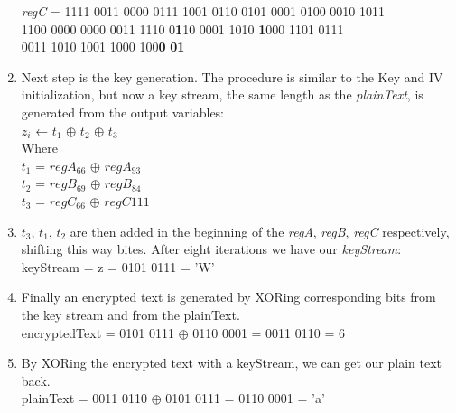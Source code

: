 \begin{enumerate}
{			\emph{regC} = 1111 0011 0000 0111 1001 0110 0101 0001 0100 0010 1011 \\ 
			\indent\hspace{1.6cm}1100 0000 0000 0011 1110 0\textbf{1}10 0001 1010 \textbf{1}000 1101 0111 \\
			\indent\hspace{1.6cm}0011 1010 1001 1000 100\textbf{0} \textbf{01}
		}
		\item Next step is the key generation. The procedure is similar to the Key and IV initialization, but now a key stream, the same length as the \emph{plainText}, is generated from the output variables:\\
		{\selectfont
			$z_i$ ← $t_1$ $\oplus$ $t_2$ $\oplus$ $t_3$\\
			Where \\
			$t_1$ = $regA_{66}$ $\oplus$ $regA_{93}$\\
			$t_2$ = $regB_{69}$ $\oplus$ $regB_{84}$\\
			$t_3$ = $regC_{66}$ $\oplus$ $regC{111}$
		}
		\item \emph{$t_3$}, \emph{$t_1$}, \emph{$t_2$} are then added in the beginning of the \emph{regA}, \emph{regB}, \emph{regC} respectively, shifting this way bites. After eight iterations we have our \emph{keyStream}:\\
		{\selectfont
			keyStream  = z = 0101 0111 = 'W'
		}
		\item Finally an encrypted text is generated by XORing corresponding bits from the key stream and from the plainText.\\
		{\selectfont
			encryptedText = 0101 0111 $\oplus$ 0110 0001 = 0011 0110 = 6
		}
		\item By XORing the encrypted text with a keyStream, we can get our plain text back.\\
		{\selectfont
			plainText = 0011 0110 $\oplus$ 0101 0111 = 0110 0001 = 'a'
		}
	\end{enumerate}
	
